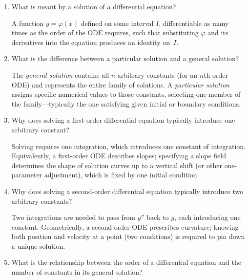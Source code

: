 \documentclass{self-check}
\begin{document}
\begin{enumerate}[leftmargin=*, itemsep=8pt]
    \begin{answer}
      The specific member of the family---i.e.\ the particular solution. The constant encodes which initial condition was imposed, or equivalently which curve in the family the solution lies on. The ODE retains only the \emph{shape} (direction field) shared by all members, not the identity of any individual curve.
    \end{answer}
  \item What is meant by a solution of a differential equation?

    \begin{answer}
      A function \(y=\varphi(x)\) defined on some interval \(I\), differentiable as many times as the order of the ODE requires, such that substituting \(\varphi\) and its derivatives into the equation produces an identity on~\(I\).
    \end{answer}
  \item What is the difference between a particular solution and a general solution?

    \begin{answer}
      The \emph{general solution} contains all \(n\) arbitrary constants (for an \(n\)th-order ODE) and represents the entire family of solutions. A \emph{particular solution} assigns specific numerical values to those constants, selecting one member of the family---typically the one satisfying given initial or boundary conditions.
    \end{answer}
  \item Why does solving a first-order differential equation typically introduce one arbitrary constant?

    \begin{answer}
      Solving requires one integration, which introduces one constant of integration. Equivalently, a first-order ODE describes slopes; specifying a slope field determines the shape of solution curves up to a vertical shift (or other one-parameter adjustment), which is fixed by one initial condition.
    \end{answer}
  \item Why does solving a second-order differential equation typically introduce two arbitrary constants?

    \begin{answer}
      Two integrations are needed to pass from \(y''\) back to \(y\), each introducing one constant. Geometrically, a second-order ODE prescribes curvature; knowing both position and velocity at a point (two conditions) is required to pin down a unique solution.
    \end{answer}
  \item What is the relationship between the order of a differential equation and the number of constants in its general solution?


\end{enumerate}
\end{document}

